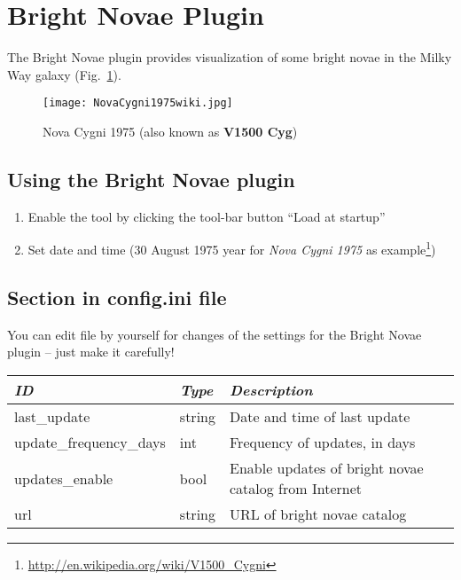 \newpage

\section{Bright Novae Plugin}
\label{sec:plugins:BrightNovae}

The Bright Novae plugin provides visualization of some bright novae in
the Milky Way galaxy (Fig.~\ref{fig:NovaCygni1975}).


\begin{figure}[h]
\texttt{[image: NovaCygni1975wiki.jpg]}
\label{fig:NovaCygni1975}
\caption{Nova Cygni 1975 (also known as \textbf{V1500 Cyg})}
\end{figure}

\subsection{Using the Bright Novae plugin}
\label{sec:plugins:BrighrNovae:using}

\begin{enumerate}
\item Enable the tool by clicking the tool-bar button ``Load at startup''
\item Set date and time (30 August 1975 year for \emph{Nova Cygni 1975} as example\footnote{\url{http://en.wikipedia.org/wiki/V1500_Cygni}})
\end{enumerate}

\subsection{Section  in config.ini file}
\label{sec:plugins:BrightNovae:config}

You can edit  file by yourself for changes of the
settings for the Bright Novae plugin -- just make it carefully!

\begin{longtabu} to \textwidth {l|l|X}\toprule
\emph{ID}            & \emph{Type} & \emph{Description}\\\midrule
last\_update            & string & Date and time of last update\\\midrule
update\_frequency\_days & int    & Frequency of updates, in days\\\midrule
updates\_enable         & bool   & Enable updates of bright novae catalog from Internet \\\midrule
url                     & string & URL of bright novae catalog \\\bottomrule
\end{longtabu}

